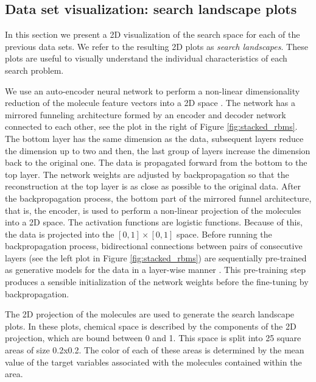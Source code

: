 \subsection{Data set visualization: search landscape plots}

In this section we present a 2D visualization of the search space for each of
the previous data sets. We refer to the resulting 2D plots as \emph{search
landscapes}. These plots are useful to visually understand the individual
characteristics of each search problem. 

We use an
auto-encoder neural network to perform a non-linear dimensionality reduction of the molecule feature vectors
into a 2D space \cite{Hinton_2006}. The network has a mirrored
funneling architecture formed by an encoder and decoder network connected to
each other, see the plot in the
right of Figure \ref{fig:stacked_rbms}. The bottom layer has the same dimension as the data, subsequent
layers reduce the dimension up to two and then, the last group of layers
increase the dimension back to the original one. 
The data is propagated forward from the bottom to the top layer. The network
weights are adjusted by backpropagation so that the reconstruction at the top
layer is as close as possible to the original data. After
the backpropagation process, the bottom part of the mirrored funnel architecture, that is, the
encoder, is used to perform a non-linear projection of the molecules into a 2D
space. The activation functions are logistic functions. Because of this, the data is projected into the $[0,1]\times[0,1]$ space. Before running the backpropagation process, bidirectional
connections between pairs of consecutive layers (see the left plot in Figure
\ref{fig:stacked_rbms}) are sequentially pre-trained as
generative models for the data in a layer-wise manner \cite{Hinton_2006}. This pre-training step
produces a sensible initialization of the network weights before the fine-tuning by backpropagation.

The 2D projection of the molecules are used to generate the search
landscape plots. In these plots, chemical space is described by the components of the 2D projection,
which are bound between 0 and 1. This space is split into 25 square areas of size 0.2x0.2. 
The color of each of these areas is determined by the mean value of the target variables associated with the molecules contained within the area.

